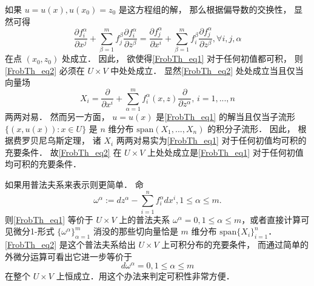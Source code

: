 如果 $u=u(x),u(x_0)=z_0$ 是这方程组的解， 那么根据偏导数的交换性， 显然可得
\begin{equation}\label{FrobTh_eq2}
\frac{\partial f_i^\alpha}{\partial x^j}+\sum_{\beta=1}^mf_j^\beta\frac{\partial f_i^\alpha}{\partial z^\beta}
=\frac{\partial f_j^\alpha}{\partial x^i}+\sum_{\beta=1}^mf_i^\beta\frac{\partial f_j^\alpha}{\partial z^\beta},\forall i,j,\alpha
\end{equation}
在点 $(x_0,z_0)$ 处成立． 因此， 欲使得\autoref{FrobTh_eq1} 对于任何初值都可积， 则\autoref{FrobTh_eq2} 必须在 $U\times V$ 中处处成立． 显然\autoref{FrobTh_eq2} 处处成立当且仅当向量场
$$
X_i=\frac{\partial}{\partial x^i}+\sum_{\alpha=1}^mf_i^\alpha(x,z)\frac{\partial}{\partial z^\alpha},\,i=1,...,n
$$
两两对易． 然而另一方面， $u=u(x)$ 是\autoref{FrobTh_eq1} 的解当且仅当子流形 $\{(x,u(x)):x\in U\}$ 是 $n$ 维分布 $\text{span}(X_1,...,X_n)$ 的积分子流形． 因此， 根据费罗贝尼乌斯定理， 诸 $X_i$ 两两对易实为\autoref{FrobTh_eq1} 对于任何初值均可积的充要条件． 故\autoref{FrobTh_eq2} 在 $U\times V$ 上处处成立是\autoref{FrobTh_eq1} 对于任何初值均可积的充要条件．

如果用普法夫系来表示则更简单． 命
\begin{equation}\label{FrobTh_eq3}
\omega^\alpha:=dz^\alpha-\sum_{i=1}^nf_i^\alpha dx^i,1\leq\alpha\leq m.
\end{equation}
则\autoref{FrobTh_eq1} 等价于 $U\times V$ 上的普法夫系 $\omega^\alpha=0,1\leq\alpha\leq m$，或者直接计算可见微分1-形式 $\{\omega^\alpha\}_{\alpha=1}^m$ 消没的那些切向量恰是 $m$ 维分布 $\text{span}\{X_i\}_{i=1}^n$． \autoref{FrobTh_eq2} 是这个普法夫系给出 $U\times V$ 上可积分布的充要条件， 而通过简单的外微分运算可看出它进一步等价于
$$
d\omega^\alpha=0,1\leq\alpha\leq m
$$
在整个 $U\times V$ 上恒成立．用这个办法来判定可积性非常方便．
